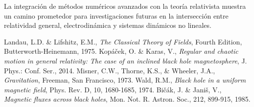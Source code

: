 \documentclass[a4paper,12pt]{article}
\begin{document}
La integración de métodos numéricos avanzados con la teoría relativista muestra un camino prometedor para investigaciones futuras en la intersección entre relatividad general, electrodinámica y sistemas dinámicos no lineales.

\begin{thebibliography}{99}
 Landau, L.D. \& Lifshitz, E.M., \textit{The Classical Theory of Fields}, Fourth Edition, Butterworth-Heinemann, 1975.
 Kopáček, O. \& Karas, V., \textit{Regular and chaotic motion in general relativity: The case of an inclined black hole magnetosphere}, J. Phys.: Conf. Ser., 2014.
 Misner, C.W., Thorne, K.S., \& Wheeler, J.A., \textit{Gravitation}, Freeman, San Francisco, 1973.
 Wald, R.M., \textit{Black hole in a uniform magnetic field}, Phys. Rev. D, 10, 1680-1685, 1974.
 Bičák, J. \& Janiš, V., \textit{Magnetic fluxes across black holes}, Mon. Not. R. Astron. Soc., 212, 899-915, 1985.
\end{thebibliography}
\end{document}

